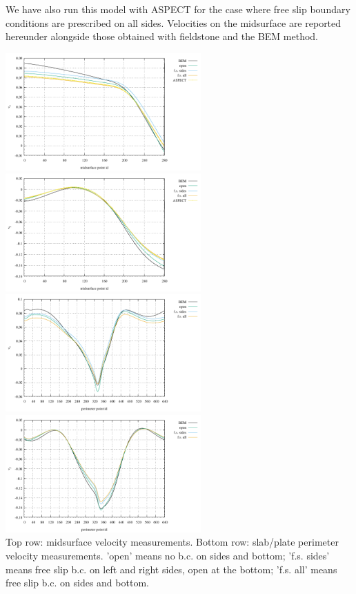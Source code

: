 We have also run this model with ASPECT for the case where free slip 
boundary conditions are prescribed on all sides. 
Velocities on the midsurface are reported hereunder alongside those
obtained with fieldstone and the BEM method.

\begin{center}
\includegraphics[width=7.5cm]{python_codes/fieldstone_55/images/u_midsurface}
\includegraphics[width=7.5cm]{python_codes/fieldstone_55/images/v_midsurface}\\
\includegraphics[width=7.5cm]{python_codes/fieldstone_55/images/u_perimeter}
\includegraphics[width=7.5cm]{python_codes/fieldstone_55/images/v_perimeter}\\
{\captionfont Top row: midsurface velocity measurements. Bottom row: slab/plate perimeter 
velocity measurements. 'open' means no b.c. on sides and bottom; 'f.s. sides' means 
free slip b.c. on left and right sides, open at the bottom; 'f.s. all' means 
free slip b.c. on sides and bottom.}
\end{center}


